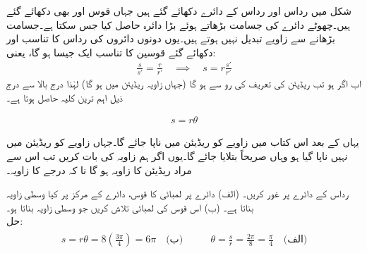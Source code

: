 شکل  میں رداس  اور رداس  کے دائرے دکھائے  گئے ہیں جہاں قوس  اور  بھی دکھائے گئے ہیں۔چھوٹے دائرے کی جسامت بڑھاتے ہوئے بڑا دائرہ حاصل کیا جس سکتا ہے۔جسامت بڑھانے سے زاویے تبدیل نہیں ہوتے ہیں۔یوں دونوں دائروں کی رداس کا تناسب اور دکھائے گئے قوسین کا تناسب ایک جیسا ہو گا، یعنی:
\begin{align*}
\frac{s}{s'}=\frac{r}{r'}\quad \implies \quad s=r\frac{s'}{r'}
\end{align*}
اب اگر  ہو تب ریڈیئن کی تعریف کی رو سے  ہو گا (جہاں زاویہ ریڈیئن میں ہو گا) لہٰذا درج بالا سے درج ذیل اہم ترین کلیہ حاصل ہوتا ہے۔
\begin{mdframed}[frametitle={قوس کی لمبائی اور ریڈیئن میں ناپے گئے زاویے کا تعلق}]
\begin{align*}
s=r\theta
\end{align*}
\end{mdframed}
% 
\begin{mdframed}[frametitle={زاویہ ناپنے کی روایت: ریڈیئن استعمال کریں}]
یہاں کے بعد اس کتاب میں زاویے کو ریڈیئن میں ناپا جائے گا۔جہاں زاویے کو ریڈیئن میں نہیں ناپا گیا ہو وہاں صریحاً بتلایا جائے گا۔یوں اگر ہم زاویہ  کی بات کریں تب اس سے مراد  ریڈیئن کا زاویہ ہو گا نا کہ  درجے کا زاویہ۔
\end{mdframed}

رداس  کے دائرے پر غور کریں۔ (الف) دائرے پر  لمبائی کا قوس، دائرے کے مرکز پر کیا وسطی زاویہ بناتا ہے۔ (ب) اس قوس کی لمبائی تلاش کریں جو 
 وسطی زاویہ بناتا ہو۔\\
حل:\quad
\begin{gather*}
\begin{aligned}
 s=r\theta=8(\tfrac{3\pi}{4})=6\pi \quad \text{(ب)}
\end{aligned}\quad\quad
\begin{aligned}
\theta=\frac{s}{r}=\frac{2\pi}{8}=\frac{\pi}{4} \quad \text{(الف)}
\end{aligned}
\end{gather*} 

